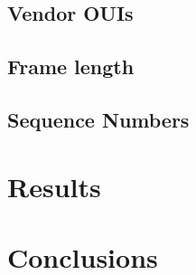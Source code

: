 \documentclass[11t, a4paper, twocolumn]{article}
\begin{document}
		\subsection{Vendor OUIs}
			\lipsum[2]
		\subsection{Frame length}
			\lipsum[2]
		\subsection{Sequence Numbers}
			\lipsum[2]

	\section{Results}\label{res}
		\lipsum[1]
	\section{Conclusions}\label{con}
		\lipsum[1-2]

	\printbibliography[title={References}]
\end{document}
